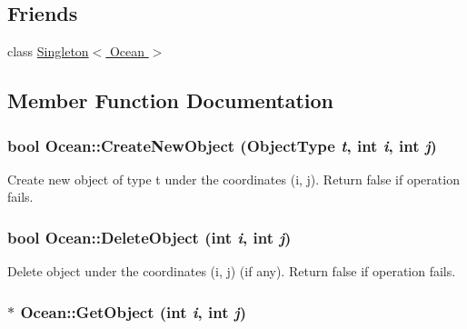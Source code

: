 \subsection*{Friends}
\begin{DoxyCompactItemize}
\item 
\hypertarget{classOcean_ae61b3a3c8247476add2d45d9cc4cb486}{
class \hyperlink{classOcean_ae61b3a3c8247476add2d45d9cc4cb486}{Singleton$<$ Ocean $>$}}
\label{classOcean_ae61b3a3c8247476add2d45d9cc4cb486}

\end{DoxyCompactItemize}


\subsection{Member Function Documentation}
\hypertarget{classOcean_a66c18f1745faa96683ba9d42bcdec9bb}{
\subsubsection[{CreateNewObject}]{\setlength{\rightskip}{0pt plus 5cm}bool Ocean::CreateNewObject (ObjectType {\em t}, \/  int {\em i}, \/  int {\em j})}}
\label{classOcean_a66c18f1745faa96683ba9d42bcdec9bb}
Create new object of type t under the coordinates (i, j). Return false if operation fails. \hypertarget{classOcean_a15165a09cbd8a6075d622902f562bc15}{
\subsubsection[{DeleteObject}]{\setlength{\rightskip}{0pt plus 5cm}bool Ocean::DeleteObject (int {\em i}, \/  int {\em j})}}
\label{classOcean_a15165a09cbd8a6075d622902f562bc15}
Delete object under the coordinates (i, j) (if any). Return false if operation fails. \hypertarget{classOcean_abe1c2639f431f057509ba765682fb8cc}{
\subsubsection[{GetObject}]{$\ast$ Ocean::GetObject (int {\em i}, \/  int {\em j})}}
